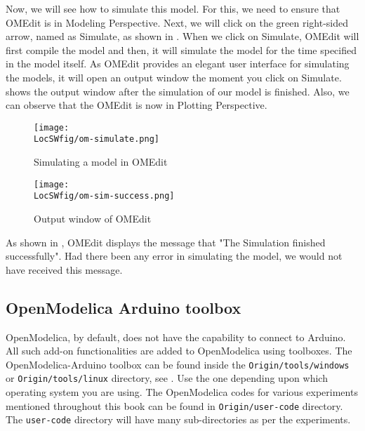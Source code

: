 Now, we will see how to simulate this model. For this, we need to ensure that OMEdit 
is in Modeling Perspective. Next, we will click on the green right-sided arrow, named as 
Simulate, as shown in . When we click on Simulate, OMEdit will first 
compile the model and then, it will simulate the model for the time specified in the model itself. 
As OMEdit provides an elegant user interface for simulating the models, 
it will open an output window the moment you click on Simulate. 
shows the output window after the simulation of our model is finished. Also, we can
observe that the OMEdit is now in Plotting Perspective. 


\begin{figure}
      \centering
      \texttt{[image: \\LocSWfig/om-simulate.png]}
      \caption{Simulating a model in OMEdit}
      \label{om-simulate}
\end{figure}

\begin{figure}
      \centering
      \texttt{[image: \\LocSWfig/om-sim-success.png]}
      \caption{Output window of OMEdit}
      \label{om-sim-success}
\end{figure}

As shown in , OMEdit displays the message that "The 
Simulation finished successfully". Had there been any error in simulating the model, 
we would not have received this message. 


\subsection{OpenModelica Arduino toolbox}
OpenModelica, by default, does not have the capability to connect to Arduino. 
All such add-on functionalities are added to OpenModelica using toolboxes. 
The OpenModelica-Arduino toolbox can be found inside
the {\tt Origin/tools/windows} or {\tt Origin/tools/linux} directory,
see .  Use the one depending upon
which operating system you are using. The OpenModelica codes for various
experiments mentioned throughout this book can be found in {\tt Origin/user-code} directory. The {\tt user-code} directory will have
many sub-directories as per the experiments. 

